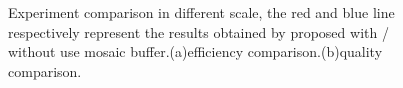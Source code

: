 \documentclass[journal]{IEEEtran}
\begin{document}
\begin{figure}[!t]
    \centering
    \caption{Experiment comparison in different scale, the red and blue line respectively represent the results obtained by proposed with / without use mosaic buffer.(a)efficiency comparison.(b)quality comparison.}
    \label{fig:seamline-efficiency-comparison}
\end{figure}
\end{document}
